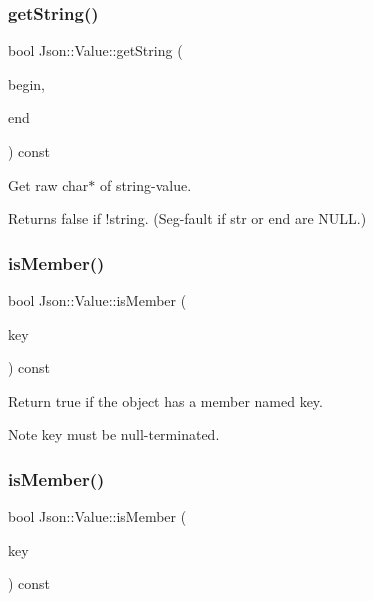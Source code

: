 \subsubsection{\texorpdfstring{get\+String()}{getString()}}
{\footnotesize\ttfamily bool Json\+::\+Value\+::get\+String (\begin{DoxyParamCaption}\item[{char const $\ast$$\ast$}]{begin,  }\item[{char const $\ast$$\ast$}]{end }\end{DoxyParamCaption}) const}

Get raw char$\ast$ of string-\/value. \begin{DoxyReturn}{Returns}
false if !string. (Seg-\/fault if str or end are N\+U\+LL.) 
\end{DoxyReturn}
\mbox{\label{classJson_1_1Value_ad6d4df2227321bab05e86667609a7fad}} 
\subsubsection{\texorpdfstring{is\+Member()}{isMember()}\hspace{0.1cm}{\footnotesize\ttfamily [1/2]}}
{\footnotesize\ttfamily bool Json\+::\+Value\+::is\+Member (\begin{DoxyParamCaption}\item[{const char $\ast$}]{key }\end{DoxyParamCaption}) const}

Return true if the object has a member named key. \begin{DoxyNote}{Note}
\textquotesingle{}key\textquotesingle{} must be null-\/terminated. 
\end{DoxyNote}
\mbox{\label{classJson_1_1Value_a0c2cd838217b23ee6bde8135de1b30d9}} 
\subsubsection{\texorpdfstring{is\+Member()}{isMember()}\hspace{0.1cm}{\footnotesize\ttfamily [2/2]}}
{\footnotesize\ttfamily bool Json\+::\+Value\+::is\+Member (\begin{DoxyParamCaption}\item[{const J\+S\+O\+N\+C\+P\+P\+\_\+\+S\+T\+R\+I\+NG \&}]{key }\end{DoxyParamCaption}) const}

